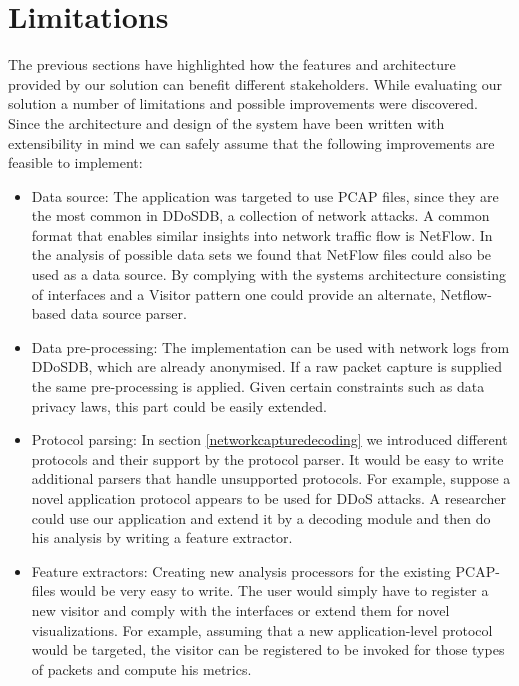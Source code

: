 \section{Limitations}\label{limitations}%
The previous sections have highlighted how the features and architecture provided by our solution can benefit different stakeholders.
While evaluating our solution a number of limitations and possible improvements were discovered. Since the architecture and design of the system have been written with extensibility in mind we can safely assume that the following improvements are feasible to implement:
\begin{itemize}

    \item Data source: The application was targeted to use PCAP files, since they are the most common in DDoSDB, a collection of network attacks. A common format that enables similar insights into network traffic flow is NetFlow. In the analysis of possible data sets we found that NetFlow files could also be used as a data source. By complying with the systems architecture consisting of interfaces and a Visitor pattern one could provide an alternate, Netflow-based data source parser.
    
    \item Data pre-processing: The implementation can be used with network logs from DDoSDB, which are already anonymised. If a raw packet capture is supplied the same pre-processing is applied. Given certain constraints such as data privacy laws, this part could be easily extended.
    
    \item Protocol parsing: 
    In section \ref{networkcapturedecoding} we introduced different protocols and their support by the protocol parser. It would be easy to write additional parsers that handle unsupported protocols. For example, suppose a novel application protocol appears to be used for DDoS attacks. A researcher could use our application and extend it by a decoding module and then do his analysis by writing a feature extractor.
    
    \item Feature extractors:
    Creating new analysis processors for the existing PCAP-files would be very easy to write. The user would simply have to register a new visitor and comply with the interfaces or extend them for novel visualizations. For example, assuming that a new application-level protocol would be targeted, the visitor can be registered to be invoked for those types of packets and compute his metrics.
   

\end{itemize}
